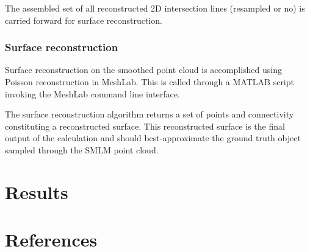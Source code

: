 \documentclass[10pt,a4paper]{article}
\begin{document}
The assembled set of all reconstructed 2D intersection lines (resampled or no) is carried forward for surface reconstruction.


\subsubsection{Surface reconstruction}

Surface reconstruction on the smoothed point cloud is accomplished using Poisson reconstruction \cite{kazhdan2006poisson} in MeshLab.  This is called through a MATLAB script invoking the MeshLab command line interface. 

The surface reconstruction algorithm returns a set of points and connectivity constituting a reconstructed surface.  This reconstructed surface is the final output of the calculation and should best-approximate the ground truth object sampled through the SMLM point cloud. 

\section{Results}

\section{References}

	
\end{document}
